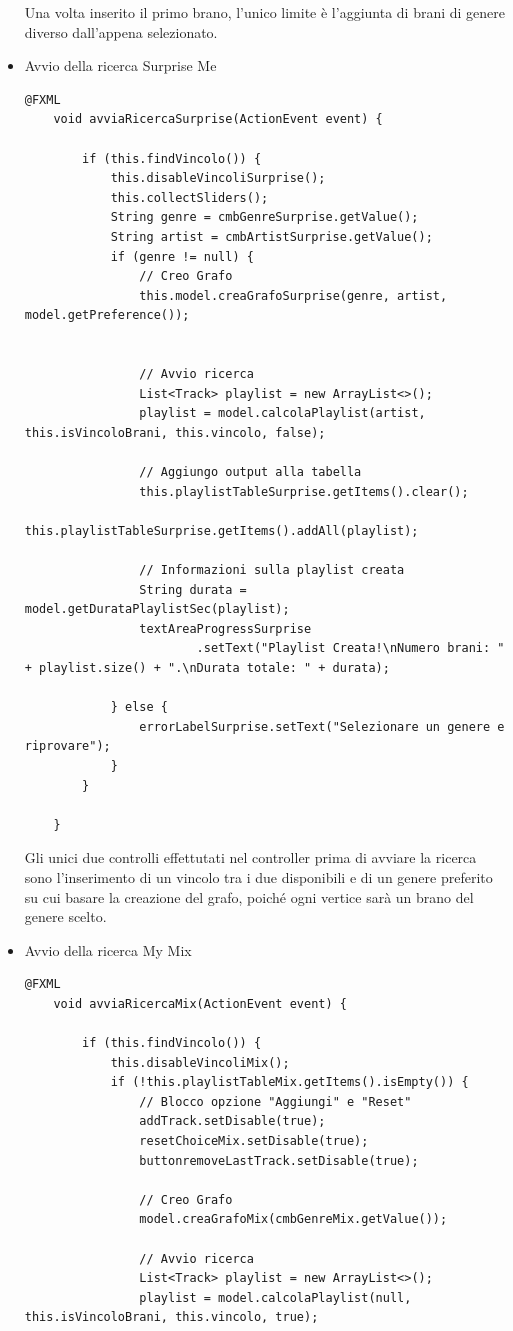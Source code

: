 \documentclass[12pt, a4paper]{article}
\begin{document}
\begin{itemize}
Una volta inserito il primo brano, l'unico limite è l'aggiunta di brani di genere diverso dall'appena selezionato.

\newpage
\item Avvio della ricerca Surprise Me
\begin{lstlisting}
@FXML
	void avviaRicercaSurprise(ActionEvent event) {
		
		if (this.findVincolo()) {
			this.disableVincoliSurprise();
			this.collectSliders();
			String genre = cmbGenreSurprise.getValue();
			String artist = cmbArtistSurprise.getValue();
			if (genre != null) {
				// Creo Grafo
				this.model.creaGrafoSurprise(genre, artist, model.getPreference());


				// Avvio ricerca
				List<Track> playlist = new ArrayList<>();
				playlist = model.calcolaPlaylist(artist, this.isVincoloBrani, this.vincolo, false);

				// Aggiungo output alla tabella
				this.playlistTableSurprise.getItems().clear();
				this.playlistTableSurprise.getItems().addAll(playlist);

				// Informazioni sulla playlist creata
				String durata = model.getDurataPlaylistSec(playlist);
				textAreaProgressSurprise
						.setText("Playlist Creata!\nNumero brani: " + playlist.size() + ".\nDurata totale: " + durata);

			} else {
				errorLabelSurprise.setText("Selezionare un genere e riprovare");
			}
		}

	}
\end{lstlisting}

Gli unici due controlli effettutati nel controller prima di avviare la ricerca sono l'inserimento di un vincolo tra i due disponibili e di un genere preferito su cui basare la creazione del grafo, poiché ogni vertice sarà un brano del genere scelto.

\newpage
\item Avvio della ricerca My Mix
\begin{lstlisting}
@FXML
	void avviaRicercaMix(ActionEvent event) {
		
		if (this.findVincolo()) {
			this.disableVincoliMix();
			if (!this.playlistTableMix.getItems().isEmpty()) {
				// Blocco opzione "Aggiungi" e "Reset"
				addTrack.setDisable(true);
				resetChoiceMix.setDisable(true);
				buttonremoveLastTrack.setDisable(true);

				// Creo Grafo
				model.creaGrafoMix(cmbGenreMix.getValue());

				// Avvio ricerca
				List<Track> playlist = new ArrayList<>();
				playlist = model.calcolaPlaylist(null, this.isVincoloBrani, this.vincolo, true);


\end{lstlisting}
\end{itemize}
\end{document}
